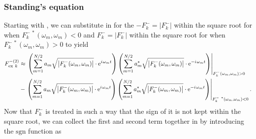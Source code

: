 \subsubsection{Standing's equation}
Starting with , we can substitute in for the $-F_k^- = \left| F_k^- \right|$ within the square root for when $F_{k}^{-~*}(\omega_m,\omega_m) < 0$ and $F_k^- = \left| F_k^- \right|$ within the square root for when $F_{k}^{-~*}(\omega_m,\omega_m) > 0$ to yield
\begin{align}
   {F_{\text{ex}~k}^{- (2)}} &\approx 
            \left.   \left( \sum\limits_{m=1}^{N/2}
                        {a_m}    \sqrt{  \left| F_k^{-}(\omega_m,\omega_m)    \right|}
                        \cdot \mathrm{e}^{{i\mkern1.5mu} \omega_m t} \right)
                     \left( \sum\limits_{m=1}^{N/2}
                        {a_m^*}  \sqrt{  \left| F_k^{-}(\omega_m,\omega_m)    \right|}
                        \cdot \mathrm{e}^{- {i\mkern1.5mu} \omega_m t} \right)
              \right|_{F_{k}^{-}(\omega_m,\omega_m) > 0} \nonumber\\
         &-  \left.  \left( \sum\limits_{m=1}^{N/2}
                        {a_m}    \sqrt{  \left| F_k^{-}(\omega_m,\omega_m)    \right|}
                        \cdot \mathrm{e}^{{i\mkern1.5mu} \omega_m t} \right)
                     \left( \sum\limits_{m=1}^{N/2}
                        {a_m^*}  \sqrt{  \left| F_k^{-}(\omega_m,\omega_m)    \right|}
                        \cdot \mathrm{e}^{- {i\mkern1.5mu} \omega_m t} \right)
              \right|_{F_{k}^{-~*}(\omega_m,\omega_m) < 0}.
\label{eq:NewmanRevised3}
\end{align}
Now that $F_k^-$ is treated in such a way that the sign of it is not kept within the square root, we can collect the first and second term together in  by introducing the $\mathrm{sgn}$ function as
